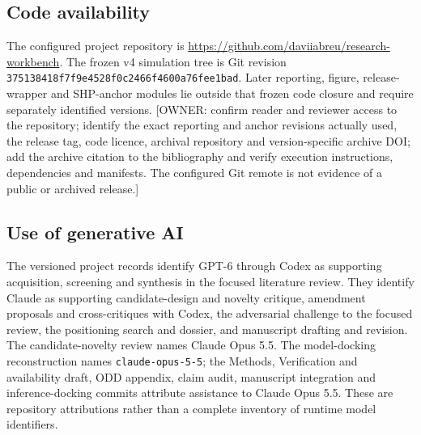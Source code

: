 \subsection*{Code availability}
The configured project repository is
\url{https://github.com/daviiabreu/research-workbench}.
The frozen v4 simulation tree is Git revision
\texttt{375138418f7f9e4528f0c2466f4600a76fee1bad}.
Later reporting, figure, release-wrapper and SHP-anchor modules lie outside that
frozen code closure and require separately identified versions.
[OWNER: confirm reader and reviewer access to the repository; identify the exact
reporting and anchor revisions actually used, the release tag, code licence,
archival repository and version-specific archive DOI; add the archive citation
to the bibliography and verify execution instructions, dependencies and manifests.
The configured Git remote is not evidence of a public or archived release.]

\subsection*{Use of generative AI}
The versioned project records identify GPT-6 through Codex as supporting acquisition,
screening and synthesis in the focused literature review. They identify Claude
as supporting candidate-design and novelty critique, amendment proposals and
cross-critiques with Codex, the adversarial challenge to the focused review,
the positioning search and dossier, and manuscript drafting and revision.
The candidate-novelty review names Claude Opus 5.5. The model-docking reconstruction
names \texttt{claude-opus-5-5}; the Methods, Verification and availability draft,
ODD appendix, claim audit, manuscript integration and inference-docking commits
attribute assistance to Claude Opus 5.5. These are repository attributions rather
than a complete inventory of runtime model identifiers.

